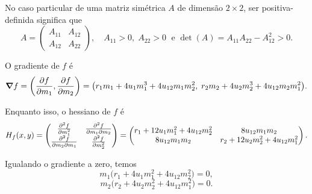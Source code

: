 \documentclass[a4paper,10pt]{article}
\begin{document}
\n

No caso particular de uma matriz simétrica $A$ de dimensão $2 \times 2$, ser positiva-definida significa que
$$
A =
\begin{pmatrix}
A_{11} & A_{12} \\
A_{12}& A_{22}
\end{pmatrix}
, \quad A_{11} > 0, \; A_{22} > 0 \; \text{ e } \det(A) = A_{11} A_{22} - A_{12}^2 > 0.
$$

O gradiente de $f$ é
$$
\grad{f} = \qty(\pdv{f}{m_1}, \pdv{f}{m_2}) =
\qty(r_1 m_1 + 4u_1 m_1^3 + 4u_{12} m_1 m_2^2, \; r_2 m_2 + 4u_2 m_2^3 + 4u_{12} m_2 m_1^2).
$$

Enquanto isso, o hessiano de $f$ é
$$
H_f(x, y) =
\begin{pmatrix}
\pdv[2]{f}{m_1} & \pdv{f}{m_1}{m_2} \\
\pdv{f}{m_2}{m_1} & \pdv[2]{f}{m_2}
\end{pmatrix}
=
\begin{pmatrix}
r_1 + 12 u_1 m_1^2 + 4 u_{12} m_2^2  & 8 u_{12} m_1 m_2 \\
8 u_{12} m_1 m_2 & r_2 + 12 u_2 m_2^2 + 4 u_{12} m_1^2
\end{pmatrix}.
$$


Igualando o gradiente a zero, temos
$$
\boxed{m_1 \Big(
r_1 + 4 u_1 m_1^2 + 4 u_{12} m_2^2
\Big) = 0,}
$$
$$
\boxed{m_2 \Big(
r_2 + 4 u_2 m_2^2 + 4 u_{12} m_1^2
\Big) = 0.}
$$

\n\n\n
\end{document}
